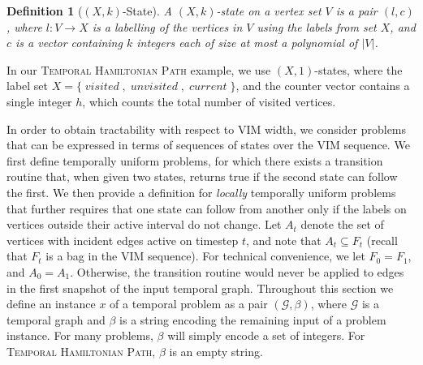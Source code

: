 \documentclass[a4paper,UKenglish,cleveref, autoref, thm-restate]{lipics-v2021} %
\DeclareMathOperator{\visited}{\textit{visited}}
\DeclareMathOperator{\unvisited}{\textit{unvisited}}
\DeclareMathOperator{\current}{\textit{current}}
\newcounter{ctheorem}
\newtheorem{defn}[ctheorem]{Definition}
\begin{document}
\begin{defn}[$(X,k)$-State]
    A $(X,k)$-state on a vertex set $V$ is a pair $(l, c)$, where $l : V \to X$ is a labelling of the vertices in $V$ using the labels from set $X$, and $c$ is a vector containing $k$ integers each of size at most a polynomial of $|V|$.
\end{defn}

In our \textsc{Temporal Hamiltonian Path} example, we use $(X,1)$-states, where the label set $X=\{\visited,\unvisited,\current\}$, and the counter vector contains a single integer $h$, which counts the total number of visited vertices.

In order to obtain tractability with respect to VIM width, we consider problems that can be expressed in terms of sequences of states over the VIM sequence.
We first define temporally uniform problems, for which there exists a transition routine that, when given two states, returns true if the second state can follow the first. We then provide a definition for \textit{locally} temporally uniform problems that further requires that one state can follow from another only if
the labels on vertices outside their active interval do not change. Let $A_t$ denote the set of vertices with incident edges active on timestep $t$, and note that $A_t \subseteq F_t$ (recall that $F_t$ is a bag in the VIM sequence). 
For technical convenience, we let $F_0 = F_1$, and $A_0=A_1$. Otherwise, the transition routine would never be applied to edges in the first snapshot of the input temporal graph.  Throughout this section we define an instance $x$ of a temporal problem as a pair $(\mathcal{G},\beta)$, where $\mathcal{G}$ is a temporal graph and $\beta$ is a string encoding the remaining input of a problem instance. For many problems, $\beta$ will simply encode a set of integers. For \textsc{Temporal Hamiltonian Path}, $\beta$ is an empty string.
\end{document}
